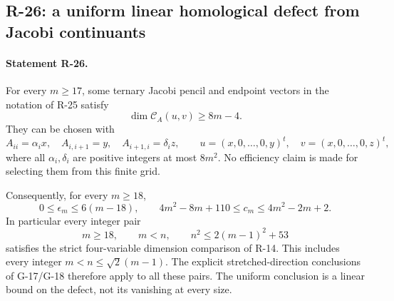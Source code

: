 \subsection{R-26: a uniform linear homological defect from Jacobi continuants}

\paragraph{Statement R-26.}
For every $m\geq17$, some ternary Jacobi pencil and endpoint vectors
in the notation of R-25 satisfy
\begin{equation}\label{R26:criterion}
 \dim\mathcal C_A(u,v)\geq8m-4.
\end{equation}
They can be chosen with
\[
 A_{ii}=\alpha_i x,\quad A_{i,i+1}=y,\quad
 A_{i+1,i}=\delta_i z,\qquad
 u=(x,0,\ldots,0,y)^t,\quad v=(x,0,\ldots,0,z)^t,
\]
where all $\alpha_i,\delta_i$ are positive integers at most $8m^2$.
No efficiency claim is made for selecting them from this finite grid.

Consequently, for every $m\geq18$,
\begin{equation}\label{R26:linear_defect}
 0\leq\epsilon_m\leq6(m-18),\qquad
 4m^2-8m+110\leq c_m\leq4m^2-2m+2.
\end{equation}
In particular every integer pair
\begin{equation}\label{R26:padding}
 m\geq18,\qquad m<n,\qquad n^2\leq2(m-1)^2+53
\end{equation}
satisfies the strict four-variable dimension comparison of R-14.
This includes every integer $m<n\leq\sqrt2(m-1)$.
The explicit stretched-direction conclusions of G-17/G-18 therefore
apply to all these pairs. The uniform conclusion is a linear bound
on the defect, not its vanishing at every size.

